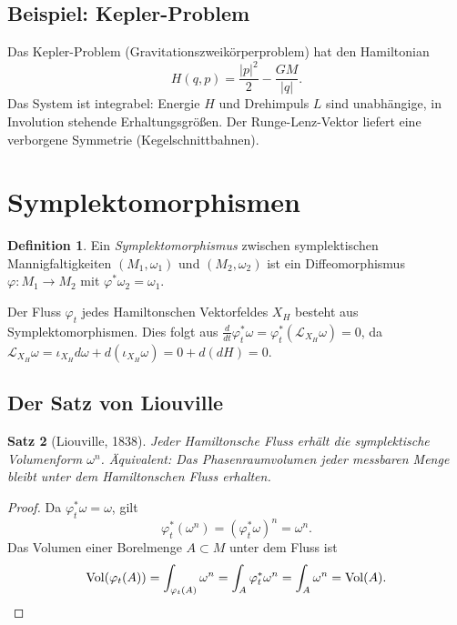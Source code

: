 \documentclass[12pt,a4paper]{amsart}
\newtheorem{theorem}{Satz}[section]
\theoremstyle{definition}
\newtheorem{definition}[theorem]{Definition}
\begin{document}
\subsection{Beispiel: Kepler-Problem}

Das Kepler-Problem (Gravitationszweikörperproblem) hat den Hamiltonian
\[
  H(q, p) = \frac{|p|^2}{2} - \frac{GM}{|q|}.
\]
Das System ist integrabel: Energie $H$ und Drehimpuls $L$ sind unabhängige,
in Involution stehende Erhaltungsgrößen.  Der Runge-Lenz-Vektor liefert eine
verborgene Symmetrie (Kegelschnittbahnen).

\section{Symplektomorphismen}
\label{sec:symplekto}

\begin{definition}
Ein \emph{Symplektomorphismus} zwischen symplektischen Mannigfaltigkeiten
$(M_1, \omega_1)$ und $(M_2, \omega_2)$ ist ein Diffeomorphismus
$\varphi: M_1 \to M_2$ mit $\varphi^* \omega_2 = \omega_1$.
\end{definition}

Der Fluss $\varphi_t$ jedes Hamiltonschen Vektorfeldes $X_H$ besteht aus
Symplektomorphismen.  Dies folgt aus
$\frac{d}{dt}\varphi_t^*\omega = \varphi_t^*(\mathcal{L}_{X_H}\omega) = 0$,
da $\mathcal{L}_{X_H}\omega = \iota_{X_H}d\omega + d(\iota_{X_H}\omega)
= 0 + d(dH) = 0$.

\subsection{Der Satz von Liouville}

\begin{theorem}[Liouville, 1838]\label{thm:liouville}
Jeder Hamiltonsche Fluss erhält die symplektische Volumenform $\omega^n$.
Äquivalent: Das Phasenraumvolumen jeder messbaren Menge bleibt unter dem
Hamiltonschen Fluss erhalten.
\end{theorem}

\begin{proof}
Da $\varphi_t^*\omega = \omega$, gilt
\[
  \varphi_t^*(\omega^n) = (\varphi_t^*\omega)^n = \omega^n.
\]
Das Volumen einer Borelmenge $A \subset M$ unter dem Fluss ist
\[
  \mathrm{Vol}(\varphi_t(A)) = \int_{\varphi_t(A)} \omega^n
  = \int_A \varphi_t^*\omega^n = \int_A \omega^n = \mathrm{Vol}(A). \qedhere
\]
\end{proof}
\end{document}
